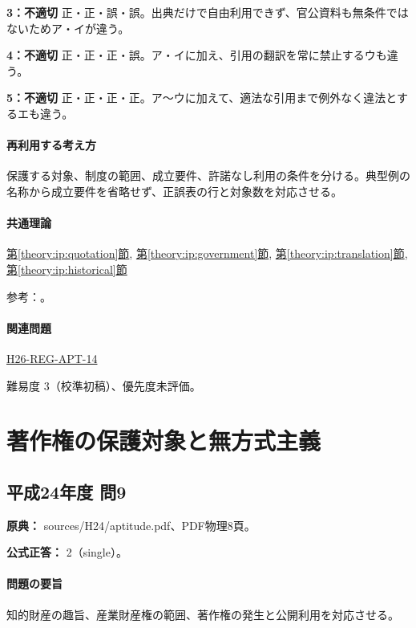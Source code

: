 \noindent\textbf{3：不適切} 正・正・誤・誤。出典だけで自由利用できず、官公資料も無条件ではないためア・イが違う。\par

\noindent\textbf{4：不適切} 正・正・正・誤。ア・イに加え、引用の翻訳を常に禁止するウも違う。\par

\noindent\textbf{5：不適切} 正・正・正・正。ア〜ウに加えて、適法な引用まで例外なく違法とするエも違う。\par

\paragraph{再利用する考え方} 保護する対象、制度の範囲、成立要件、許諾なし利用の条件を分ける。典型例の名称から成立要件を省略せず、正誤表の行と対象数を対応させる。

\paragraph{共通理論} \hyperref[theory:ip:quotation]{第\ref*{theory:ip:quotation}節}, \hyperref[theory:ip:government]{第\ref*{theory:ip:government}節}, \hyperref[theory:ip:translation]{第\ref*{theory:ip:translation}節}, \hyperref[theory:ip:historical]{第\ref*{theory:ip:historical}節}

\par 参考：\cite{ip_copyright_statute}。

\paragraph{関連問題} \hyperref[q:h26-reg-apt-14]{H26-REG-APT-14}

\par 難易度 3（校準初稿）、優先度未評価。

\section{著作権の保護対象と無方式主義}

\subsection{平成24年度 問9}
\label{q:h24-reg-apt-09}

\noindent\textbf{原典：} sources/H24/aptitude.pdf、PDF物理8頁。

\textbf{公式正答：} 2（single）。

\paragraph{問題の要旨} 知的財産の趣旨、産業財産権の範囲、著作権の発生と公開利用を対応させる。

